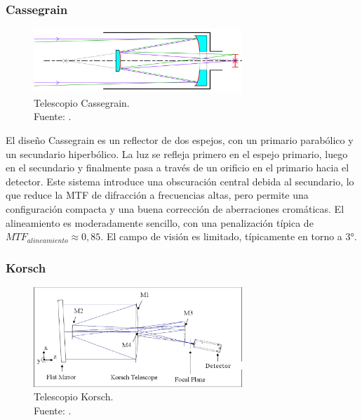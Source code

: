 \subsubsection{Cassegrain}

\begin{figure}[H]
    \centering
    \includegraphics[width=0.7\textwidth]{3.Conceptos_Previos/Cassegrain_Telescope.svg.png}
    \caption{Telescopio Cassegrain. \\Fuente: \cite{cassegrain_telescope_diagram}.}
    \label{fig:Cassegrain}
\end{figure}

El diseño Cassegrain es un reflector de dos espejos, con un primario parabólico y un secundario hiperbólico. La luz se refleja primero en el espejo primario, luego en el secundario y finalmente pasa a través de un orificio en el primario hacia el detector. Este sistema introduce una obscuración central debida al secundario, lo que reduce la MTF de difracción a frecuencias altas, pero permite una configuración compacta y una buena corrección de aberraciones cromáticas. El alineamiento es moderadamente sencillo, con una penalización típica de $MTF_{alineamiento} \approx 0,85$. El campo de visión es limitado, típicamente en torno a 3°.

\subsubsection{Korsch}

\begin{figure}[H]
    \centering
    \includegraphics[width=0.7\textwidth]{3.Conceptos_Previos/Korsch.jpg}
    \caption{Telescopio Korsch. \\Fuente: \cite{korsch_telescope_system}.}
    \label{fig:Korsch}
\end{figure}

